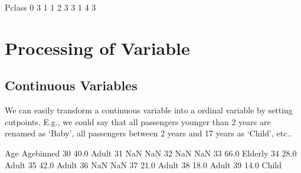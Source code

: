 \documentclass[letterpaper,10pt,english]{jupyterBook}
\begin{document}
\begin{sphinxVerbatim}[commandchars=\\\{\}]
   Pclass
0       3
1       1
2       3
3       1
4       3
\end{sphinxVerbatim}


\chapter{Processing of Variable}
\label{\detokenize{Data_Basics:processing-of-variable}}

\section{Continuous Variables}
\label{\detokenize{Data_Basics:id1}}
\sphinxAtStartPar
We can easily transform a continuous variable into a ordinal variable by setting cut\sphinxhyphen{}points. E.g., we could say that all passengers younger than 2 years are renamed as ‘Baby’, all passengers between 2 years and 17 years as ‘Child’, etc..

\begin{sphinxVerbatim}[commandchars=\\\{\}]
\PYG{p}{[}\PYG{p}{]} \PYG{p}{[}\PYG{p}{]}\PYG{p}{[}\PYG{p}{]}
\PYG{p}{[}\PYG{p}{[}\PYG{p}{]}\PYG{p}{]}\PYG{p}{[}\PYG{p}{]}
\end{sphinxVerbatim}

\begin{sphinxVerbatim}[commandchars=\\\{\}]
     Age Age\PYGZus{}binned
30  40.0      Adult
31   NaN        NaN
32   NaN        NaN
33  66.0    Elderly
34  28.0      Adult
35  42.0      Adult
36   NaN        NaN
37  21.0      Adult
38  18.0      Adult
39  14.0      Child
\end{sphinxVerbatim}
\end{document}
